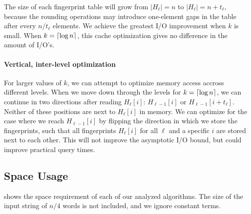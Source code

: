 \documentclass[a4]{article}
\newcommand*{\pref}{\prettyref}
\begin{document}
The size of each fingerprint table will grow from $|H_\ell| = n$ to $|H_\ell| = n+t_\ell$, because the rounding operations may introduce one-element gaps in the table after every $n/t_\ell$ elements. We achieve the greatest I/O improvement when $k$ is small. When $k=\lceil\log n\rceil$, this cache optimization gives no difference in the amount of I/O's.

\paragraph{Vertical, inter-level optimization}

For larger values of $k$, we can attempt to optimize memory access accross different levels. When we move down through the levels for $k=\lceil\log n\rceil$, we can continue in two directions after reading $H_\ell[i]$: $H_{\ell-1}[i]$ or $H_{\ell-1}[i+t_\ell]$. Neither of these positions are next to $H_\ell[i]$ in memory. We can optimize for the case where we reach $H_{\ell-1}[i]$ by flipping the direction in which we store the fingerprints, such that all fingerprints $H_\ell[i]$ for all $\ell$ and a specific $i$ are stored next to each other. This will not improve the asymptotic I/O bound, but could improve practical query times.

\subsection{Space Usage}

\pref{tab:algorithms-space} shows the space requirement of each of our analyzed algorithms. The size of the input string of $n/4$ words is not included, and we ignore constant terms.
\end{document}
